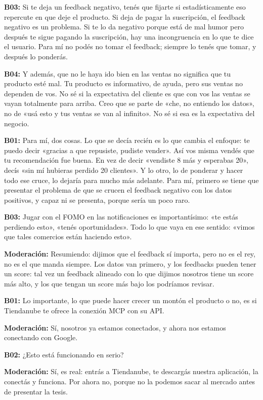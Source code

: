 \noindent\textbf{B03:} Si te deja un feedback negativo, tenés que fijarte si estadísticamente eso repercute en que deje el producto. Si deja de pagar la suscripción, el feedback negativo es un problema. Si te lo da negativo porque está de mal humor pero después te sigue pagando la suscripción, hay una incongruencia en lo que te dice el usuario. Para mí no podés no tomar el feedback; siempre lo tenés que tomar, y después lo ponderás.

\noindent\textbf{B04:} Y además, que no le haya ido bien en las ventas no significa que tu producto esté mal. Tu producto es informativo, de ayuda, pero sus ventas no dependen de vos. No sé si la expectativa del cliente es que con vos las ventas se vayan totalmente para arriba. Creo que se parte de «che, no entiendo los datos», no de «usá esto y tus ventas se van al infinito». No sé si esa es la expectativa del negocio.

\noindent\textbf{B01:} Para mí, dos cosas. Lo que se decía recién es lo que cambia el enfoque: te puedo decir «gracias a que repusiste, pudiste vender». Así vos misma vendés que tu recomendación fue buena. En vez de decir «vendiste 8 más y esperabas 20», decís «sin mí hubieras perdido 20 clientes». Y lo otro, lo de ponderar y hacer todo ese cruce, lo dejaría para mucho más adelante. Para mí, primero se tiene que presentar el problema de que se crucen el feedback negativo con los datos positivos, y capaz ni se presenta, porque sería un poco raro.

\noindent\textbf{B03:} Jugar con el FOMO en las notificaciones es importantísimo: «te estás perdiendo esto», «tenés oportunidades». Todo lo que vaya en ese sentido: «vimos que tales comercios están haciendo esto».

\noindent\textbf{Moderación:} Resumiendo: dijimos que el feedback sí importa, pero no es el rey, no es el que manda siempre. Los datos van primero, y los feedbacks pueden tener un score: tal vez un feedback alineado con lo que dijimos nosotros tiene un score más alto, y los que tengan un score más bajo los podríamos revisar.

\noindent\textbf{B01:} Lo importante, lo que puede hacer crecer un montón el producto o no, es si Tiendanube te ofrece la conexión MCP con su API.

\noindent\textbf{Moderación:} Sí, nosotros ya estamos conectados, y ahora nos estamos conectando con Google.

\noindent\textbf{B02:} ¿Esto está funcionando en serio?

\noindent\textbf{Moderación:} Sí, es real: entrás a Tiendanube, te descargás nuestra aplicación, la conectás y funciona. Por ahora no, porque no la podemos sacar al mercado antes de presentar la tesis.

